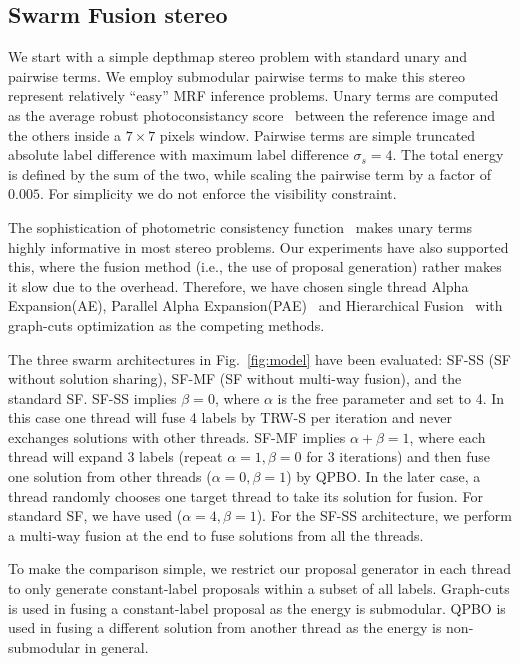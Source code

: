 \subsection{Swarm Fusion stereo}
We start with a simple depthmap stereo problem with standard unary and
pairwise terms. We employ submodular pairwise terms to make this
stereo represent relatively ``easy'' MRF inference problems.
%
Unary terms are computed as the average robust photoconsistancy
score~\cite{second_order_stereo} between the reference image and the others
inside a $7\times 7$ pixels window.  Pairwise terms are simple
truncated absolute label difference with maximum label difference
$\sigma_s=4$. The total energy is defined by the sum of the two, while
scaling the pairwise term by a factor of $0.005$. For simplicity we
do not enforce the visibility constraint.

%


\noindent The sophistication of photometric consistency
function~\cite{mvs_furukawa_survey} makes unary terms highly informative
in most stereo problems.  Our experiments have also supported this,
where the fusion method (i.e., the use of proposal generation) rather
makes it slow due to the overhead.
Therefore, we have chosen single thread Alpha Expansion(AE), Parallel
Alpha
Expansion(PAE)~\cite{fusion_moves_for_markov_random_field_optimization}
and Hierarchical
Fusion~\cite{delong_hierarchical_fusion,olga_hierarchical_alpha_expansion}
with graph-cuts optimization as the competing methods.




\noindent The three swarm architectures in Fig.~\ref{fig:model} have
been evaluated: SF-SS (SF without solution sharing), SF-MF (SF without
multi-way fusion), and the standard SF.
%
SF-SS implies $\beta=0$, where $\alpha$ is the free parameter and set to
4. In this case one thread will fuse 4 labels by TRW-S per iteration and
never exchanges solutions with other threads. SF-MF implies
$\alpha+\beta=1$, where each thread will expand 3 labels (repeat
$\alpha=1, \beta=0$ for 3 iterations) and then fuse one solution from
other threads ($\alpha=0, \beta=1$) by QPBO. In the later case, a thread
randomly chooses one target thread to take its solution for fusion. For standard SF,
we have used ($\alpha=4, \beta=1$). For the SF-SS architecture, we
perform a multi-way fusion at the end to fuse solutions from all the threads.

%
%
%
%
To make the comparison simple, we restrict our proposal generator
in each thread to only generate constant-label proposals within a
subset of all labels. Graph-cuts is used in fusing a constant-label
proposal as the energy is submodular. QPBO is used in fusing a
different solution from another thread as the energy is
non-submodular in general.
%
